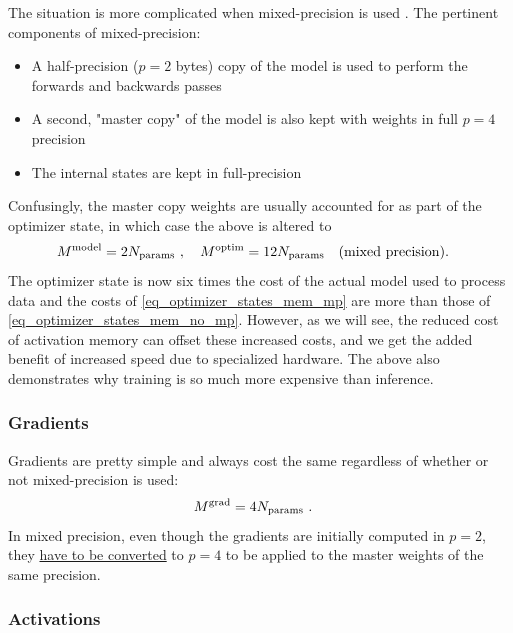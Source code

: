 \documentclass[11pt]{article}
\begin{document}
The situation is more complicated when mixed-precision is used \cite{micikevicius2018mixed}.
The pertinent components of mixed-precision:
\begin{itemize}
\item A half-precision ($ p=2 $ bytes) copy of the model is used to perform the forwards and
    backwards passes
\item A second, "master copy" of the model is also kept with weights in full $ p=4 $ precision
\item The internal  states are kept in full-precision
\end{itemize}
Confusingly, the master copy weights are usually accounted for as part of the optimizer state, in
which case the above is altered to
\begin{align}
    M ^{ \rm model} &= 2 N _{ \rm params } \ , \quad M^{ \rm  optim } = 12 N _{ \rm params }
    \quad ({\rm mixed \ precision}) .
    \label{eq_optimizer_states_mem_mp}
\end{align}
The optimizer state is now six times the cost of the actual model used to process data and the costs
of \eqref{eq_optimizer_states_mem_mp} are more than those of \eqref{eq_optimizer_states_mem_no_mp}.
However, as we will see, the reduced cost of activation memory can offset these increased costs, and
we get the added benefit of increased speed due to specialized hardware. The above also demonstrates
why training is so much more expensive than inference.


\subsubsection{Gradients}

Gradients are pretty simple and always cost the same regardless of whether or not mixed-precision is
used:
\begin{align}
    M ^{ \rm grad} &= 4 N _{ \rm params }     \label{eq_grad_memory} \ .
\end{align}
In mixed precision, even though the gradients are initially computed in $ p= 2$, they
\href{https://huggingface.co/docs/transformers/v4.20.1/en/perf_train_gpu_one#anatomy-of-models-memory}{have to
be converted} to $ p=4 $ to be applied to the master weights of the same precision.




\subsubsection{Activations}
\end{document}
